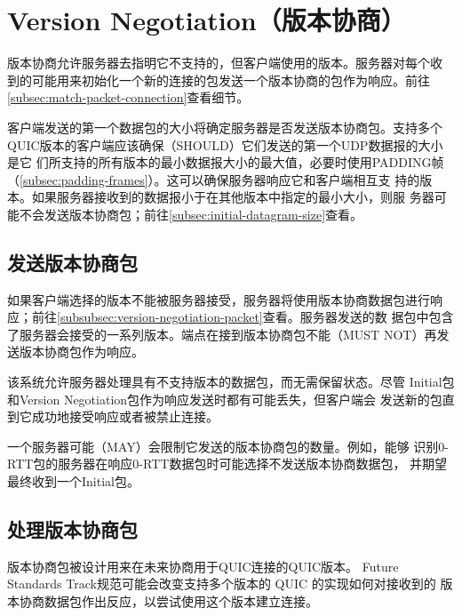 \section{Version Negotiation（版本协商）}
版本协商允许服务器去指明它不支持的，但客户端使用的版本。服务器对每个收
到的可能用来初始化一个新的连接的包发送一个版本协商的包作为响应。前往
\ref{subsec:match-packet-connection}查看细节。

客户端发送的第一个数据包的大小将确定服务器是否发送版本协商包。支持多个
QUIC版本的客户端应该确保（SHOULD）它们发送的第一个UDP数据报的大小是它
们所支持的所有版本的最小数据报大小的最大值，必要时使用PADDING帧
（\ref{subsec:padding-frames}）。这可以确保服务器响应它和客户端相互支
持的版本。如果服务器接收到的数据报小于在其他版本中指定的最小大小，则服
务器可能不会发送版本协商包；前往\ref{subsec:initial-datagram-size}查看。

\subsection{发送版本协商包}
如果客户端选择的版本不能被服务器接受，服务器将使用版本协商数据包进行响
应；前往\ref{subsubsec:version-negotiation-packet}查看。服务器发送的数
据包中包含了服务器会接受的一系列版本。端点在接到版本协商包不能（MUST
NOT）再发送版本协商包作为响应。

该系统允许服务器处理具有不支持版本的数据包，而无需保留状态。尽管
Initial包和Version Negotiation包作为响应发送时都有可能丢失，但客户端会 
发送新的包直到它成功地接受响应或者被禁止连接。

一个服务器可能（MAY）会限制它发送的版本协商包的数量。例如，能够
识别0-RTT包的服务器在响应0-RTT数据包时可能选择不发送版本协商数据包，
并期望最终收到一个Initial包。

\subsection{处理版本协商包}
版本协商包被设计用来在未来协商用于QUIC连接的QUIC版本。 Future
Standards Track规范可能会改变支持多个版本的 QUIC 的实现如何对接收到的
版本协商数据包作出反应，以尝试使用这个版本建立连接。